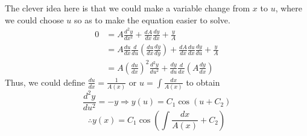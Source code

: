 \item

The clever idea here is that we could make a variable change from $x$ to $u$,
where we could choose $u$ so as to make the equation easier to solve.
\begin{align*}
	0
	&= A \frac{d^2 y}{dx^2} + \frac{dA}{dx} \frac{dy}{dx} + \frac{y}{A} \\
	&= A \frac{du}{dx} \frac{d}{du} \left( \frac{du}{dx} \frac{dy}{dy} \right)
	   + \frac{dA}{dx} \frac{du}{dx} \frac{dy}{du} + \frac{y}{A} \\
	&= A {\left( \frac{du}{dx} \right)}^2 \frac{d^2 y}{du^2}
	   + \frac{dy}{du} \frac{d}{dx} \left( A \frac{dy}{dx} \right)
\end{align*}
Thus, we could define $\frac{du}{dx} = \frac{1}{A(x)}$ or $u = \int \frac{dx}{A(x)}$ to obtain
\[
	\frac{d^2 y}{du^2} = -y
	\Rightarrow y(u) = C_1 \cos \left( u + C_2 \right)
\]
\[
	\therefore y(x) = C_1 \cos \left( \int \frac{dx}{A(x)} + C_2 \right)
\]